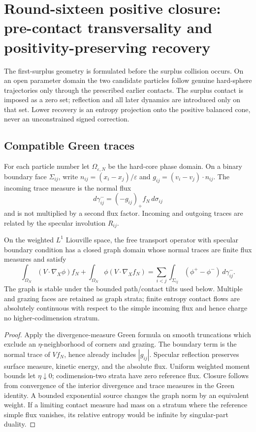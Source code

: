 \section{Round-sixteen positive closure: pre-contact transversality and positivity-preserving recovery}
\label{sec:r16-b2}

The first-surplus geometry is formulated before the surplus collision occurs.
On an open parameter domain the two candidate particles follow genuine
hard-sphere trajectories only through the prescribed earlier contacts.  The
surplus contact is imposed as a zero set; reflection and all later dynamics are
introduced only on that set.  Lower recovery is an entropy projection onto the
positive balanced cone, never an unconstrained signed correction.

\subsection{Compatible Green traces}

For each particle number let \(\Omega_{\varepsilon,N}\) be the hard-core phase
domain.  On a binary boundary face \(\Sigma_{ij}\), write
\(n_{ij}=(x_i-x_j)/\varepsilon\) and
\(g_{ij}=(v_i-v_j)\cdot n_{ij}\).  The incoming trace measure is the normal
flux
\[
 d\gamma^-_{ij}=(-g_{ij})_+ f_N\,d\sigma_{ij}
\]
and is not multiplied by a second flux factor.  Incoming and outgoing traces
are related by the specular involution \(R_{ij}\).

\begin{theorem}
\label{thm:r16-b2-trace}
On the weighted \(L^1\) Liouville space, the free transport operator with
specular boundary condition has a closed graph domain whose normal traces are
finite flux measures and satisfy
\[
 \int_{\Omega_N} (V\cdot\nabla_X\phi)f_N
 +\int_{\Omega_N}\phi(V\cdot\nabla_X f_N)
 =\sum_{i<j}\int_{\Sigma_{ij}}(\phi^+-\phi^-)\,d\gamma^-_{ij}.
\]
The graph is stable under the bounded path/contact tilts used below.  Multiple
and grazing faces are retained as graph strata; finite entropy contact flows
are absolutely continuous with respect to the simple incoming flux and hence
charge no higher-codimension stratum.
\end{theorem}

\begin{proof}
Apply the divergence-measure Green formula on smooth truncations which exclude
an \(\eta\)-neighborhood of corners and grazing.  The boundary term is the
normal trace of \(Vf_N\), hence already includes \(|g_{ij}|\).  Specular
reflection preserves surface measure, kinetic energy, and the absolute flux.
Uniform weighted moment bounds let \(\eta\downarrow0\); codimension-two strata
have zero reference flux.  Closure follows from convergence of the interior
divergence and trace measures in the Green identity.  A bounded exponential
source changes the graph norm by an equivalent weight.  If a limiting contact
measure had mass on a stratum where the reference simple flux vanishes, its
relative entropy would be infinite by singular-part duality.
\end{proof}

